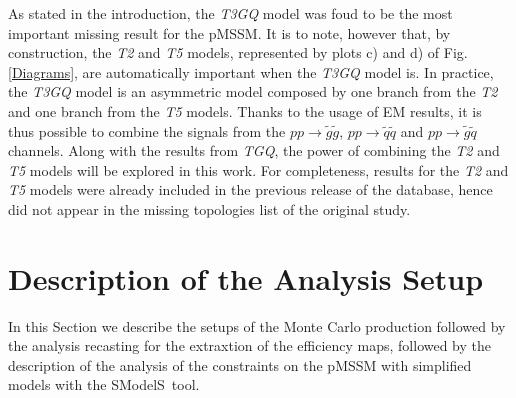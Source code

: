 \documentclass[a4paper,10pt]{article}
\newcommand{\SMO}{{\sc SModelS}}
\begin{document}
%
As stated in the introduction, the \textit{T3GQ} model was foud to be the most important missing result for the pMSSM. It is to note, however that, by construction, the \textit{T2} and \textit{T5} models, represented by plots c) and d) of Fig. \ref{Diagrams}, are automatically important when the \textit{T3GQ} model is. In practice, the \textit{T3GQ} model is an asymmetric model composed by one branch from the \textit{T2} and one branch from the \textit{T5} models. Thanks to the usage of EM results, it is thus possible to combine the signals from the $pp \rightarrow \tilde g \tilde g$, $pp \rightarrow \tilde q \tilde q$ and $pp \rightarrow \tilde g \tilde q$ channels. Along with the results from \textit{TGQ}, the power of combining the \textit{T2} and \textit{T5} models will be explored in this work. For completeness, results for the \textit{T2} and \textit{T5} models were already included in the previous release of the database, hence did not appear in the missing topologies list of the original study.

\section{Description of the Analysis Setup}\label{sec::setup}
In this Section we describe the setups of the Monte Carlo production followed by the analysis recasting for the extraxtion of the efficiency maps, followed by the description of the analysis of the constraints on the pMSSM with simplified models with the \SMO~tool.
\end{document}
